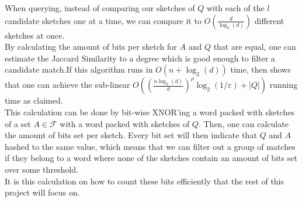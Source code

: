 When querying, instead of comparing our sketches of $Q$ with each of the $l$ candidate sketches one at a time, we can compare it to $O(\frac{d}{\log_2(d)})$ different sketches at once. \\
By calculating the amount of bits per sketch for $A$ and $Q$ that are equal, one can estimate the Jaccard Similarity to a degree which is good enough to filter a candidate match.If this algorithm runs in $O(n + \log_2{(d)})$ time, then \citet{fast-similarity-search} shows that one can achieve the sub-linear $O((\frac{n\log_2(d)}{d})^{\rho}\log_2(1/\varepsilon)+|Q|)$ running time as claimed.\\
This calculation can be done by bit-wise XNOR'ing a word packed with sketches of a set $A\in \mathcal{F}$ with a word packed with sketches of $Q$. Then, one can calculate the amount of bits set per sketch. Every bit set will then indicate that $Q$ and $A$ hashed to the same value, which means that we can filter out a group of matches if they belong to a word where none of the sketches contain an amount of bits set over some threshold.\\
It is this calculation on how to count these bits efficiently that the rest of this project will focus on.
